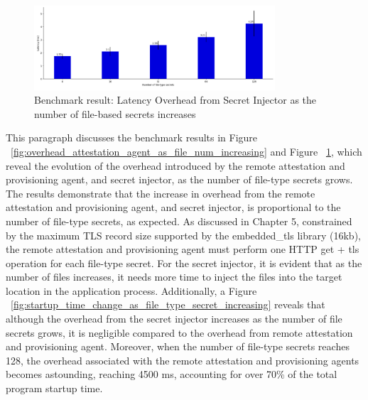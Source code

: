 \begin{figure}[H]
    \centering
    \includegraphics[width=0.8\textwidth]{images/overhead_secret_injector_as_file_num_increasing.PNG}
    \caption[Benchmark result: Latency Overhead from Secret Injector as the number of file-based secrets increases]{Benchmark result: Latency Overhead from Secret Injector as the number of file-based secrets increases}
    \label{fig:overhead_secret_injector_as_file_num_increasing}
\end{figure}


This paragraph discusses the benchmark results in Figure ~\ref{fig:overhead_attestation_agent_as_file_num_increasing} and Figure ~\ref{fig:overhead_secret_injector_as_file_num_increasing}, which reveal the evolution of the overhead introduced by the remote attestation and provisioning agent, and secret injector, as the number of file-type secrets grows. The results demonstrate that the increase in 
overhead from the remote attestation and provisioning agent, and secret injector, is proportional to the number of file-type secrets, as expected. As discussed in Chapter 5, constrained by the maximum TLS record size supported by the embedded\_tls library (16kb), the remote attestation and provisioning 
agent must perform one HTTP get + tls operation for each file-type secret. For the secret injector, it is evident that as the number of files increases, it needs more time to inject the files into the target location in the application process.  Additionally, a 
Figure ~\ref{fig:startup_time_change_as_file_type_secret_increasing} reveals that although the overhead from the secret injector increases as the number of file secrets grows, it is negligible compared to the overhead from remote attestation and provisioning agent. Moreover, when the number of file-type secrets reaches 128, 
the overhead associated with the remote attestation and provisioning agents becomes astounding, reaching 4500 ms, accounting for over 70\% of the total program startup time.

